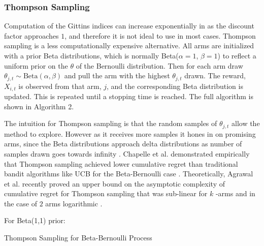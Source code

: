 \documentclass[journal,transmag]{IEEEtran}%
\begin{document}
\subsubsection{Thompson Sampling}
Computation of the Gittins indices can increase exponentially in as the discount factor approaches $1$, and therefore it is not ideal to use in most cases. 
Thompson sampling is a less computationally expensive alternative.
All arms are initialized with a prior Beta distributions, which is normally Beta($\alpha=1$,  $\beta =1$) to reflect a uniform prior on the $\theta$ of the Bernoulli distribution.
Then for each arm draw $\theta_{j,t} \sim \mbox{Beta}(\alpha,\beta)$ and pull the arm with the highest $\theta_{j,t}$ drawn.
The reward, $X_{i,t}$ is observed from that arm, $j$, and the corresponding Beta distribution is updated.
This is repeated until a stopping time is reached. The full algorithm is shown in Algorithm 2.  

The intuition for Thompson sampling is that the random samples of $\theta_{j,t}$ allow the method to explore. However as it receives more samples it hones in on promising arms, since the Beta distributions approach delta distributions as number of samples drawn goes towards infinity \cite{goetschalckx2011continuous}. Chapelle et al. demonstrated empirically that Thompson sampling achieved lower cumulative regret than traditional bandit algorithms like UCB for the Beta-Bernoulli case \cite{chapelle2011empirical}. Theoretically, Agrawal et al. recently proved an upper bound on the asymptotic complexity of  cumulative regret for  Thompson sampling that was sub-linear  for $k$ -arms and in the case of $2$ arms logarithmic \cite{agrawal2011analysis}. 

\begin{algorithm}
 For Beta(1,1) prior: \\
 \caption{Thompson Sampling for Beta-Bernoulli Process}
\end{algorithm}
\vspace{-2ex}
\end{document}
